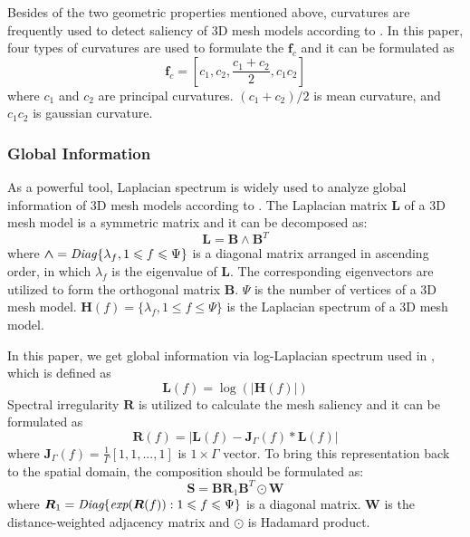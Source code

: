 \documentclass[runningheads]{article}
\begin{document}
Besides of the two geometric properties mentioned above, curvatures \cite{Curvatures} are frequently used to detect saliency of 3D mesh models according to \cite{Meshsaliency2005mesh,akagunduz2009scale,LSP20073d,randomforest20143d,machine3dkeypoint2013machine}. In this paper, four types of curvatures are used to formulate the \emph{$\bm{f}_c$} and it can be formulated as
\begin{equation}
	\bm{f}_c = [c_1,c_2,\frac{c_1+c_2}{2},c_1c_2]
\end{equation}
where \emph{$c_1$} and \emph{$c_2$} are principal curvatures. \emph{$(c_1+c_2)/2$} is mean curvature, and \emph{$c_1c_2$} is gaussian curvature.

\subsubsection{Global Information}
As a powerful tool, Laplacian spectrum is widely used to analyze global information of 3D mesh models according to \cite{hu2009salient,song20133d,song2014mesh,Pauly,Levy:2010:SMP:1837101.1837109,Zhang:2012:VMD:2167076.2167079}. The Laplacian matrix \emph{$\bm{L}$} of a 3D mesh model is a symmetric matrix and it can be decomposed as:
\begin{equation}
\bm{L} = \bm{B \wedge B}^T
\end{equation}
where \emph{$\bm{\wedge} = \text{\emph{Diag}}\{\lambda_f,1\leqslant f \leqslant \Psi\}$} is a diagonal matrix arranged in ascending order, in which \emph{$\lambda_f$} is the eigenvalue of \emph{$\bm{L}$}. The corresponding eigenvectors are utilized to form the orthogonal matrix \emph{$\bm{B}$}. \emph{$\Psi$} is the number of vertices of a 3D mesh model. \emph{$\bm{H}(f) = \{\lambda_f,1\leqslant f \leqslant \Psi\}$} is the Laplacian spectrum of a 3D mesh model.

In this paper, we get global information via log-Laplacian spectrum used in \cite{song2014mesh}, which is defined as
\begin{equation}
	\bm{L}(f) = \log(|\bm{H}(f)|)
\end{equation}
Spectral irregularity \emph{$\bm{R}$} is utilized to calculate the mesh saliency and it can be formulated as
\begin{equation}
	\bm{R}(f) = |\bm{L}(f)-\bm{J}_\Gamma(f)*\bm{L}(f)|
\end{equation}
where \emph{$\bm{J}_\Gamma(f) = \frac{1}{\Gamma}[1,1,...,1]$} is \emph{$1\times\Gamma$} vector. To bring this representation back to the spatial domain, the composition should be formulated as:
\begin{equation}
	\bm{S} = \bm{B}\bm{R}_1\bm{B}^T\odot \bm{W}
\end{equation}
where \emph{$\bm{R}_1 = \emph{Diag}\{\emph{exp}(\bm{R}(f)):1\leqslant f\leqslant \Psi\}$} is a diagonal matrix. \emph{$\bm{W}$} is the distance-weighted adjacency matrix and \emph{$\odot$} is Hadamard product.
\end{document}
